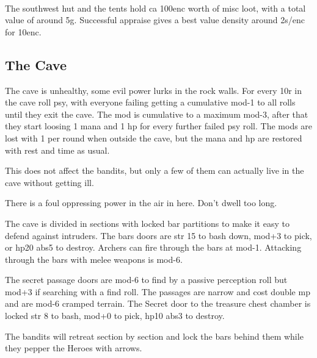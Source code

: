 \


The southwest hut and the tents hold ca 100enc worth of misc loot, with a total value of around 5g. Successful appraise gives a best value density around 2s/enc for 10enc.


\subsection*{The Cave}
The cave is unhealthy, some evil power lurks in the rock walls. For every 10r in the cave roll psy, with everyone failing getting a cumulative mod-1 to all rolls until they exit the cave. The mod is cumulative to a maximum mod-3, after that they start loosing 1 mana and 1 hp for every further failed psy roll. The mods are lost with 1 per round when outside the cave, but the mana and hp are restored with rest and time as usual.

This does not affect the bandits, but only a few of them can actually live in the cave without getting ill.

\begin{readoutloud}
There is a foul oppressing power in the air in here. Don't dwell too long.
\end{readoutloud}

The cave is divided in sections with locked bar partitions to make it easy to defend against intruders. The bars doors are str 15 to bash down, mod+3 to pick, or hp20 abs5 to destroy. Archers can fire through the bars at mod-1. Attacking through the bars with melee weapons is mod-6.

The secret passage doors are mod-6 to find by a passive perception roll but mod+3 if searching with a find roll. The passages are narrow and cost double mp and are mod-6 cramped terrain. The Secret door to the treasure chest chamber is locked str 8 to bash, mod+0 to pick, hp10 abs3 to destroy.

The bandits will retreat section by section and lock the bars behind them while they pepper the Heroes with arrows.

